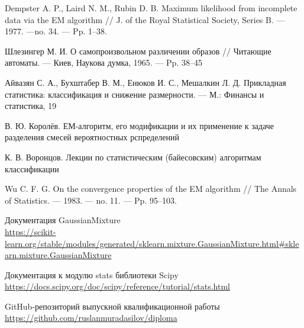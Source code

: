 \begin{thebibliography}{99}

 Dempster A. P., Laird N. M., Rubin D. B. Maximum likelihood from incomplete data via the EM algorithm // J. of the Royal Statistical Society, Series B. — 1977. —no. 34. — Pp. 1–38.

 Шлезингер М. И. О самопроизвольном различении образов // Читающие автоматы. — Киев, Наукова думка, 1965. — Pp. 38–45

 Айвазян С. А., Бухштабер В. М., Енюков И. С., Мешалкин Л. Д. Прикладная статистика: классификация и снижение размерности. — М.: Финансы и статистика, 19

 В. Ю. Королёв. ЕМ-алгоритм, его модификации и их применение к задаче разделения смесей вероятностных рспределений

 К. В. Воронцов. Лекции по статистическим (байесовским) алгоритмам классификации

 Wu C. F. G. On the convergence properties of the EM algorithm // The Annals of
Statistics. — 1983. — no. 11. — Pp. 95–103.

 Документация GaussianMixture \\ \url{https://scikit-learn.org/stable/modules/generated/sklearn.mixture.GaussianMixture.html#sklearn.mixture.GaussianMixture}

 Документация к модулю stats библиотеки Scipy \\ \url{https://docs.scipy.org/doc/scipy/reference/tutorial/stats.html}

 GitHub-репозиторий выпускной квалификационной работы \\ \url{https://github.com/ruslanmuradasilov/diploma}

\end{thebibliography}